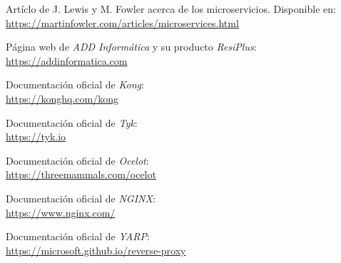 \documentclass[11pt,spanish,listoffigures]{tfgetsinf}
\begin{document}
\begin{thebibliography}{10}

	Artíclo de J. Lewis y M. Fowler acerca de los microservicios.
	\newblock Disponible en:\\
	\url{https://martinfowler.com/articles/microservices.html}

	Página web de \emph{ADD Informática} y su producto \emph{ResiPlus}:\\
	\url{https://addinformatica.com}

	Documentación oficial de \emph{Kong}:\\
	\url{https://konghq.com/kong}

	Documentación oficial de \emph{Tyk}:\\
	\url{https://tyk.io}

	Documentación oficial de \emph{Ocelot}:\\
	\url{https://threemammals.com/ocelot}

	Documentación oficial de \emph{NGINX}:\\
	\url{https://www.nginx.com/}

	Documentación oficial de \emph{YARP}:\\
	\url{https://microsoft.github.io/reverse-proxy}

\end{thebibliography}
\end{document}
